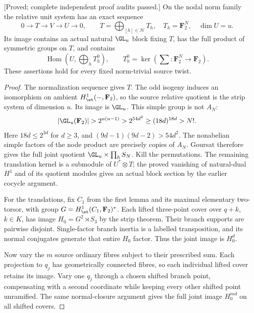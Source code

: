 \begin{lemma}
\label{lem:mixed-odd-normalization-block-hearts-candidate}
\textup{[Proved; complete independent proof audits passed.]}
On the nodal norm family the relative unit system has an exact
sequence
\[
 0\longrightarrow T\longrightarrow V\longrightarrow U
 \longrightarrow0,
 \qquad T=\bigoplus_{[h]\in\mathcal H}T_h,\quad
 T_h=\mathbf F_2^N,\quad\dim U=u.
\]
Its image contains an actual natural $\GL_u$ block fixing $T$,
has the full product of symmetric groups on $T$, and contains
\[
             \operatorname{Hom}\left(U,\bigoplus_hT_h^0\right),
 \qquad T_h^0=\ker\left(\sum:\mathbf F_2^N\to\mathbf F_2\right).
\]
These assertions hold for every fixed norm-trivial source twist.
\end{lemma}
\begin{proof}
The normalization sequence gives $T$. The odd isogeny induces
an isomorphism on ambient $H^1_{\et}(-,\mathbf F_2)$, so the
source relative quotient is the strip system of dimension $u$.
Its image is $\GL_u$. This simple group is not $A_N$:
\[
 |\GL_u(\mathbf F_2)|>2^{u(u-1)}>2^{54d^2}
       \geq(18d)^{18d}>N!.
\]
Here $18d\leq2^{3d}$ for $d\geq3$, and
$(9d-1)(9d-2)>54d^2$. The nonabelian simple factors of the
node product are precisely copies of $A_N$. Goursat therefore
gives the full joint quotient
$\GL_u\times\prod_hS_N$. Kill the permutations. The remaining
translation kernel is a submodule of $U^*\otimes T$; the proved
vanishing of natural-dual $H^1$ and of its quotient modules
gives an actual block section by the earlier cocycle argument.

For the translations, fix $C_1$ from the first lemma and its
maximal elementary two-torsor, with group
$G=H^1_{\et}(C_1,\mathbf F_2)^*$. Each lifted three-point cover
over $q+k$, $k\in K$, has image $H_0=G^2\rtimes S_3$ by the
strip theorem. Their branch supports are pairwise disjoint.
Single-factor branch inertia is a labelled transposition, and
its normal conjugates generate that entire $H_0$ factor.
Thus the joint image is $H_0^d$.

Now vary the $m$ source ordinary fibres subject to their prescribed
sum. Each projection to $q_j$ has geometrically connected fibres,
so each individual lifted cover retains its image. Vary one
$q_j$ through a chosen shifted branch point, compensating with
a second coordinate while keeping every other shifted point
unramified. The same normal-closure argument gives the full
joint image $H_0^{md}$ on all shifted covers.


\end{proof}

